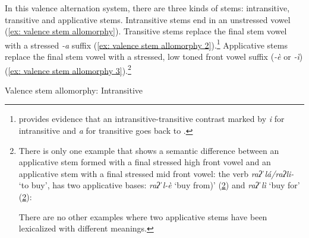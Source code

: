 In this valence alternation system, there are three kinds of stems: intransitive, transitive and applicative stems. Intransitive stems end in an unstressed vowel (\ref{ex: valence stem allomorphy}). Transitive stems replace the final stem vowel with a stressed \textit{{}-a} suffix (\ref{ex: valence stem allomorphy 2}).\footnote{\citet{heath1978uto} provides evidence that an intransitive-transitive contrast marked by \textit{i} for intransitive and \textit{a} for transitive goes back to .} Applicative stems replace the final stem vowel with a stressed, low toned front vowel suffix (\textit{{}-è} or \textit{-ì}) (\ref{ex: valence stem allomorphy 3}).\footnote{There is only one example that shows a semantic difference between an applicative stem formed with a final stressed high front vowel and an applicative stem with a final stressed mid front vowel: the verb \textit{raʔˈlá/raʔli-} ‘to buy’, has two applicative bases: \textit{raʔˈl-è} ‘buy from)’ (\ref{ex: buy for vs. by froma}) and \textit{raʔˈlì} ‘buy for’ (\ref{ex: buy for vs. by from}):

\ea\label{ex: buy for vs. by from}
    \label{ex: buy for vs. by froma}
        \label{ex: buy for vs. by fromb}
    \z
\z

There are no other examples where two applicative stems have been lexicalized with different meanings.}

\ea\label{ex: valence stem allomorphy}
{Valence stem allomorphy: Intransitive}

